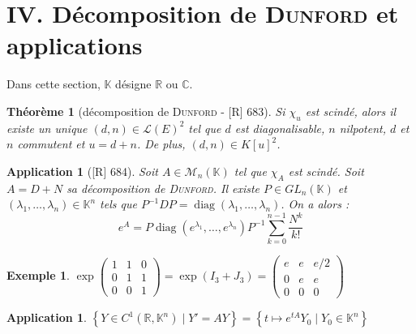 \documentclass[10pt, a4paper, parskip=full, twoside, twocolumn]{report}
\newtheorem{theorem}[definition]{Théorème}
\newtheorem{example}[definition]{Exemple}
\newtheorem{application}[definition]{Application}
\newcommand{\IK}{\mathbb{K}}
\newcommand{\IC}{\mathbb{C}}
\newcommand{\IR}{\mathbb{R}}
\DeclareMathOperator{\diag}{diag}
\begin{document}
\section*{IV. Décomposition de \textsc{Dunford} et applications}
\textcolor{paragraphtext}{Dans cette section, $\IK$ désigne $\IR$ ou $\IC$.}


\begin{tcolorbox}[
    breakable, %
    colback=developpement, %
    colframe=gray!0!black, %
    boxrule=0pt, %
    arc=1mm, %
	boxsep=0pt,
	left=0pt, right=0pt, top=0pt, bottom=0pt
]
\begin{theorem}[décomposition de \textsc{Dunford} - \textnormal{[R] 683}]
	\label{156dev11}
	Si $\chi_u$ est scindé, alors il existe un unique $(d,n)\in\mathcal{L}(E)^2$ tel que $d$ est diagonalisable, $n$ nilpotent, $d$ et $n$ commutent et $u = d + n$.
	De plus, $(d,n)\in K[u]^2$.
\end{theorem}

\begin{application}[\textnormal{[R] 684}]
	\label{156dev12}
	Soit $A\in\mathcal{M}_n(\IK)$ tel que $\chi_A$ est scindé. Soit $A = D+N$ sa
	décomposition de \textsc{Dunford}. Il existe $P\in GL_n(\IK)$ et $(\lambda_1,\dots,\lambda_n)\in\IK^n$ tels que 
	$P^{-1}DP = \diag(\lambda_1,\dots, \lambda_n)$. On a alors :
	$$e^A = P\diag(e^{\lambda_1},\dots, e^{\lambda_n})P^{-1}\sum_{k=0}^{n-1}\frac{N^k}{k!}$$
\end{application}
\end{tcolorbox}

\begin{example}
	$\exp\left(\begin{smallmatrix}
		1&1&0\\0&1&1\\0&0&1
	\end{smallmatrix}\right) = \exp\left(I_3 + J_3\right) = \left(\begin{smallmatrix}
		e&e&e/2 \\ 0&e&e \\ 0&0&0
	\end{smallmatrix}\right)$
\end{example}

\begin{application}
	$\left\{Y\in C^1(\IR,\IK^n)\mid Y' = AY\right\} = \left\{t\mapsto e^{tA}Y_0\mid Y_0\in \IK^n\right\}$
\end{application}
\end{document}
